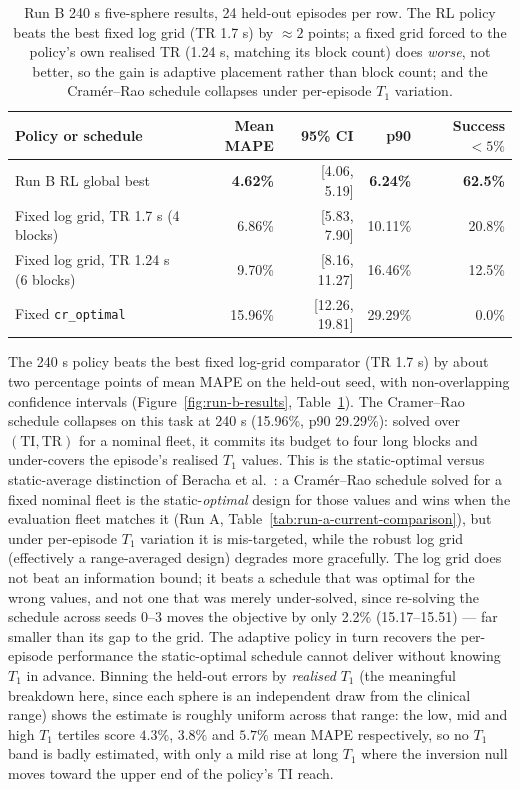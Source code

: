 \begin{table}[!htbp]
\centering
\small
\setlength{\tabcolsep}{3pt}
\renewcommand{\arraystretch}{0.92}
\begin{tabular}{lrrrr}
\toprule
Policy or schedule & Mean MAPE & 95\% CI & p90 & Success $<5\%$ \\
\midrule
Run B RL global best & \textbf{4.62\%} & [4.06, 5.19] & \textbf{6.24\%} & \textbf{62.5\%} \\
Fixed log grid, TR 1.7 s (4 blocks) & 6.86\% & [5.83, 7.90] & 10.11\% & 20.8\% \\
Fixed log grid, TR 1.24 s (6 blocks) & 9.70\% & [8.16, 11.27] & 16.46\% & 12.5\% \\
Fixed \texttt{cr\_optimal} & 15.96\% & [12.26, 19.81] & 29.29\% & 0.0\% \\
\bottomrule
\end{tabular}
\caption{Run B 240 s five-sphere results, 24 held-out episodes per row. The RL
policy beats the best fixed log grid (TR 1.7 s) by ${\approx}2$ points; a fixed
grid forced to the policy's own realised TR (1.24 s, matching its block count)
does \emph{worse}, not better, so the gain is adaptive placement rather than
block count; and the Cram\'er--Rao schedule collapses under per-episode $T_1$
variation.}
\label{tab:run-b-240}
\end{table}

The 240 s policy beats the best fixed log-grid comparator (TR 1.7 s) by about
two percentage points of mean MAPE on the held-out seed, with non-overlapping
confidence intervals (Figure~\ref{fig:run-b-results}, Table~\ref{tab:run-b-240}). The Cramer--Rao
schedule collapses on this task at 240 s (15.96\%, p90 29.29\%): solved over
$(\mathrm{TI},\mathrm{TR})$ for a nominal fleet, it commits its budget to four
long blocks and under-covers the episode's realised $T_1$ values. This is the
static-optimal versus static-average distinction of
Beracha et al.~\cite{adaptive_mri:23,optimal_sampling_crlb:96}: a Cram\'er--Rao
schedule solved for a fixed nominal fleet is the static-\emph{optimal} design
for those values and wins when the evaluation fleet matches it (Run A,
Table~\ref{tab:run-a-current-comparison}), but under per-episode $T_1$ variation
it is mis-targeted, while the robust log grid (effectively a range-averaged
design) degrades more gracefully. The log grid does not beat an information
bound; it beats a schedule that was optimal for the wrong values, and not one
that was merely under-solved, since re-solving the schedule across seeds 0--3
moves the objective by only 2.2\% (15.17--15.51) --- far smaller than its gap to
the grid. The adaptive policy in turn recovers the per-episode performance the
static-optimal schedule cannot deliver without knowing $T_1$ in advance.
Binning the held-out errors by \emph{realised} $T_1$ (the meaningful breakdown
here, since each sphere is an independent draw from the clinical range) shows
the estimate is roughly uniform across that range: the low, mid and high $T_1$
tertiles score $4.3\%$, $3.8\%$ and $5.7\%$ mean MAPE respectively, so no $T_1$
band is badly estimated, with only a mild rise at long $T_1$ where the inversion
null moves toward the upper end of the policy's TI reach.

